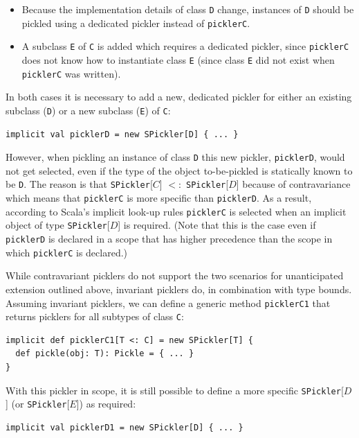 \documentclass[preprint,10pt]{sigplanconf}
\theoremstyle{definition}
\theoremstyle{definition}
\newcommand{\term}[1]{\mbox{\texttt{#1}}}
\begin{document}
\begin{itemize}
\item Because the implementation details of class \term{D} change, instances
of \term{D} should be pickled using a dedicated pickler instead of
\term{picklerC}.

\item A subclass \term{E} of \term{C} is added which requires a dedicated
pickler, since \term{picklerC} does not know how to instantiate class \term{E}
(since class \term{E} did not exist when \term{picklerC} was written).
\end{itemize}

In both cases it is necessary to add a new, dedicated pickler for either an
existing subclass (\term{D}) or a new subclass (\term{E}) of \term{C}:

\begin{lstlisting}
implicit val picklerD = new SPickler[D] { ... }
\end{lstlisting}

However, when pickling an instance of class \term{D} this new pickler,
\term{picklerD}, would not get selected, even if the type of the object to-be-pickled
is statically known to be \term{D}. The reason is that
\term{SPickler}[$C$] $<:$ \term{SPickler}[$D$] because of contravariance which
means that \term{picklerC} is more specific than \term{picklerD}. As a result,
according to Scala's implicit look-up rules \term{picklerC} is selected when
an implicit object of type \term{SPickler}[$D$] is required. (Note that this
is the case even if \term{picklerD} is declared in a scope that has higher
precedence than the scope in which \term{picklerC} is declared.)

While contravariant picklers do not support the two scenarios for
unanticipated extension outlined above, invariant picklers do, in combination
with type bounds. Assuming invariant picklers, we can define a generic method
\term{picklerC1} that returns picklers for all subtypes of class \term{C}:


\begin{lstlisting}
implicit def picklerC1[T <: C] = new SPickler[T] {
  def pickle(obj: T): Pickle = { ... }
}
\end{lstlisting}

With this pickler in scope, it is still possible to define a more specific
\term{SPickler}[$D$] (or \term{SPickler}[$E$]) as required:

\begin{lstlisting}
implicit val picklerD1 = new SPickler[D] { ... }
\end{lstlisting}
\end{document}
